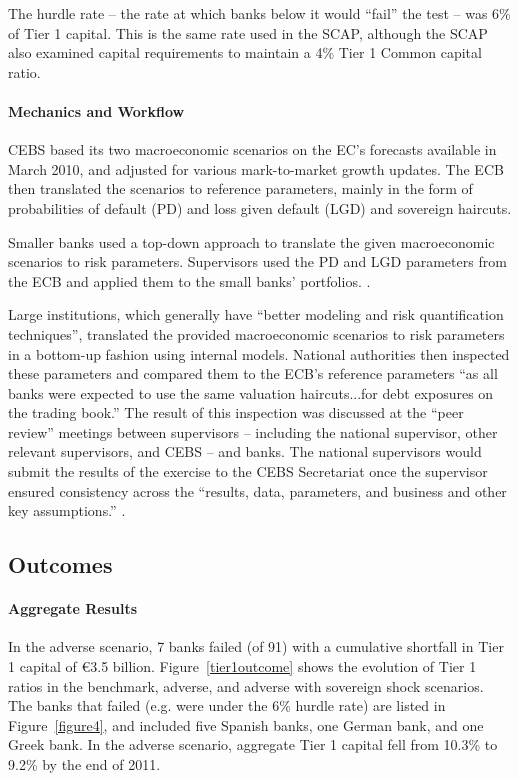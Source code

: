 \documentclass[12pt]{article}
\begin{document}
The hurdle rate -- the rate at which banks below it would ``fail'' the test -- was 6\% of Tier 1 capital. This is the same rate used in the SCAP, although the SCAP also examined capital requirements to maintain a 4\% Tier 1 Common capital ratio.

\paragraph{Mechanics and Workflow}

CEBS based its two macroeconomic scenarios on the EC's forecasts available in March 2010, and adjusted for various mark-to-market growth updates. The ECB then translated the scenarios to reference parameters, mainly in the form of probabilities of default (PD) and loss given default (LGD) and sovereign haircuts.

Smaller banks used a top-down approach to translate the given macroeconomic scenarios to risk parameters. Supervisors used the PD and LGD parameters from the ECB and applied them to the small banks' portfolios. \citet{Methodology}.

Large institutions, which generally have ``better modeling and risk quantification techniques'',  translated the provided macroeconomic scenarios to risk parameters in a bottom-up fashion using internal models. National authorities then inspected these parameters and compared them to the ECB's reference parameters ``as all banks were expected to use the same valuation haircuts...for debt exposures on the trading book.'' The result of this inspection was discussed at the ``peer review'' meetings between supervisors -- including the national supervisor, other relevant supervisors, and CEBS -- and banks. The national supervisors would submit the results of the exercise to the CEBS Secretariat once the supervisor ensured consistency across the ``results, data, parameters, and business and other key assumptions.'' \citet{Methodology}.

\subsection{Outcomes}

\paragraph{Aggregate Results} In the adverse scenario, 7 banks failed (of 91) with a cumulative shortfall in Tier 1 capital of \euro{3.5} billion. Figure~\ref{tier1outcome} shows the evolution of Tier 1 ratios in the benchmark, adverse, and adverse with sovereign shock scenarios. The banks that failed (e.g. were under the 6\% hurdle rate) are listed in Figure~\ref{figure4}, and included five Spanish banks, one German bank, and one Greek bank. In the adverse scenario, aggregate Tier 1 capital fell from 10.3\% to 9.2\% by the end of 2011.
\end{document}
